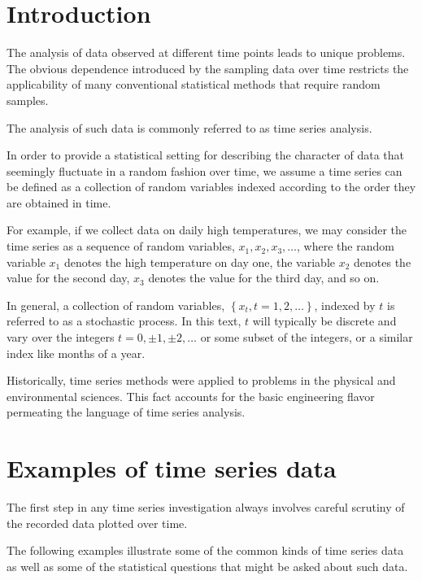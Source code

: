 \documentclass[
paper=128mm:96mm, %
fontsize=9.5pt, %
pagesize, %
parskip=half-, %
]{scrartcl} %
\theoremstyle{mythmstyle} %
\begin{document}
%
%
\section{Introduction}

The analysis of data observed at different time points leads to unique problems. The obvious dependence introduced by the sampling data over time restricts the applicability of many conventional statistical methods that require random samples. 

The analysis of such data is commonly referred to as time series analysis.

In order to provide a statistical setting for describing the character of data that seemingly fluctuate in a random fashion over time, we assume a time series can be defined as a collection of random variables indexed according to the order they are obtained in time. 

For example, if we collect data on daily high temperatures, we may consider the time series as a sequence of random variables, $x_1, x_2, x_3,\dots$, where the random variable $x_1$ denotes the high temperature on day one, the variable $x_2$ denotes the value for the second day, $x_3$ denotes the value for the third day, and so on. 
\clearpage

In general, a collection of random variables, $\left\{x_t,t=1,2,\dots\right\}$, indexed by $t$ is referred to as a stochastic process. In this text, $t$ will typically be discrete and vary over the integers $t = 0, \pm1, \pm2,\dots$ or some subset of the integers, or a similar index like months of a year.

Historically, time series methods were applied to problems in the physical and environmental sciences. This fact accounts for the basic engineering flavor permeating the language of time series analysis. 
\clearpage

\section{Examples of time series data}

The first step in any time series investigation always involves careful scrutiny of the recorded data plotted over time. 

The following examples illustrate some of the common kinds of time series data as well as some of the statistical questions that might be asked about such data.
\clearpage
%
\end{document}
